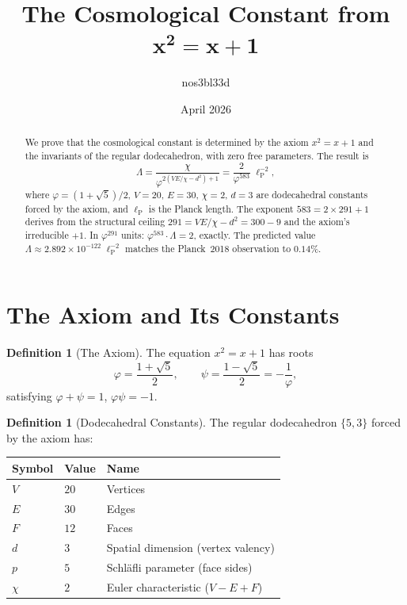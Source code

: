 \documentclass[11pt,a4paper]{article}
\theoremstyle{plain}
\theoremstyle{definition}
\newtheorem{definition}[theorem]{Definition}
\newcommand{\lP}{\ell_{\mathrm{P}}}
\newcommand{\vp}{\varphi}
\begin{document}
\title{%
  \textbf{The Cosmological Constant from}\\[4pt]
  $\boldsymbol{x^2 = x + 1}$%
}
\author{nos3bl33d}
\date{April 2026}

\maketitle

\begin{abstract}
We prove that the cosmological constant is determined by the axiom
$x^2 = x+1$ and the invariants of the regular dodecahedron, with zero
free parameters.  The result is
\[
  \Lambda = \frac{\chi}{\vp^{2(VE/\chi - d^2) + 1}}
  = \frac{2}{\vp^{583}} \;\lP^{-2},
\]
where $\vp = (1+\sqrt{5})/2$, $V = 20$, $E = 30$, $\chi = 2$, $d = 3$
are dodecahedral constants forced by the axiom, and $\lP$ is the Planck
length.  The exponent $583 = 2 \times 291 + 1$ derives from the
structural ceiling $291 = VE/\chi - d^2 = 300 - 9$ and the axiom's
irreducible $+1$.  In $\vp^{291}$ units:
$\vp^{583} \cdot \Lambda = 2$, exactly.  The predicted value
$\Lambda \approx 2.892 \times 10^{-122}\;\lP^{-2}$ matches the
Planck~2018 observation to $0.14\%$.
\end{abstract}

\section{The Axiom and Its Constants}\label{sec:axiom}

\begin{definition}[The Axiom]\label{def:axiom}
The equation $x^2 = x + 1$ has roots
\[
  \vp = \frac{1+\sqrt{5}}{2}, \qquad
  \psi = \frac{1-\sqrt{5}}{2} = -\frac{1}{\vp},
\]
satisfying $\vp + \psi = 1$, $\vp\psi = -1$.
\end{definition}

\begin{definition}[Dodecahedral Constants]\label{def:dodec}
The regular dodecahedron $\{5,3\}$ forced by the axiom has:
\begin{center}
\begin{tabular}{@{}lll@{}}
\toprule
Symbol & Value & Name \\
\midrule
$V$ & $20$ & Vertices \\
$E$ & $30$ & Edges \\
$F$ & $12$ & Faces \\
$d$ & $3$ & Spatial dimension (vertex valency) \\
$p$ & $5$ & Schl\"afli parameter (face sides) \\
$\chi$ & $2$ & Euler characteristic ($V - E + F$) \\
\bottomrule
\end{tabular}
\end{center}
\end{definition}
\end{document}
